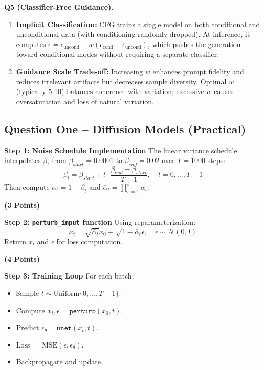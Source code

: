 \documentclass[a4paper,12pt]{article}
\begin{document}
\textbf{Q5 (Classifier-Free Guidance).}
\begin{enumerate}
    \item \textbf{Implicit Classification:} CFG trains a single model on both conditional and unconditional data (with conditioning randomly dropped). At inference, it computes $\tilde{\epsilon} = \epsilon_{\text{uncond}} + w(\epsilon_{\text{cond}} - \epsilon_{\text{uncond}})$, which pushes the generation toward conditional modes without requiring a separate classifier.
    \item \textbf{Guidance Scale Trade-off:} Increasing $w$ enhances prompt fidelity and reduces irrelevant artifacts but decreases sample diversity. Optimal $w$ (typically 5-10) balances coherence with variation; excessive $w$ causes oversaturation and loss of natural variation.
\end{enumerate}

\subsection{Question One -- Diffusion Models (Practical)}

\textbf{Step 1: Noise Schedule Implementation}
The linear variance schedule interpolates $\beta_t$ from $\beta_{start} = 0.0001$ to $\beta_{end} = 0.02$ over $T = 1000$ steps:
\[
\beta_t = \beta_{start} + t \cdot \frac{\beta_{end} - \beta_{start}}{T-1}, \quad t = 0, \dots, T-1
\]
Then compute $\alpha_t = 1 - \beta_t$ and $\bar{\alpha}_t = \prod_{s=1}^t \alpha_s$.

\textbf{(3 Points)}

\textbf{Step 2: \texttt{perturb\_input} function}
Using reparameterization:
\[
x_t = \sqrt{\bar{\alpha}_t} x_0 + \sqrt{1 - \bar{\alpha}_t} \epsilon, \quad \epsilon \sim \mathcal{N}(0, I)
\]
Return $x_t$ and $\epsilon$ for loss computation.

\textbf{(4 Points)}

\textbf{Step 3: Training Loop}
For each batch:
\begin{itemize}
    \item Sample $t \sim \mathrm{Uniform}\{0, \dots, T-1\}$.
    \item Compute $x_t, \epsilon = \texttt{perturb}(x_0, t)$.
    \item Predict $\epsilon_\theta = \texttt{unet}(x_t, t)$.
    \item Loss $= \mathrm{MSE}(\epsilon, \epsilon_\theta)$.
    \item Backpropagate and update.
\end{itemize}
\end{document}
